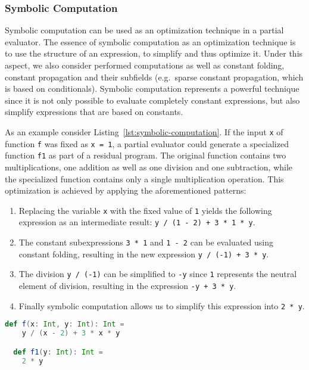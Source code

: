 \subsubsection*{Symbolic Computation}

Symbolic computation can be used as an optimization technique in a partial evaluator.
The essence of symbolic computation as an optimization technique is to use the structure of an expression, to simplify and thus optimize it.
Under this aspect, we also consider performed computations as well as constant folding, constant propagation and their subfields (e.g.\ sparse constant propagation, which is based on conditionals).
Symbolic computation represents a powerful technique since it is not only possible to evaluate completely constant expressions, but also simplify expressions that are based on constants.

As an example consider Listing~\ref{lst:symbolic-computation}.
If the input \texttt{x} of function \texttt{f} was fixed as \texttt{x = 1}, a partial evaluator could generate a specialized function \texttt{f1} as part of a residual program.
The original function contains two multiplications, one addition as well as one division and one subtraction, while the specialized function contains only a single multiplication operation.
This optimization is achieved by applying the aforementioned patterns:

\begin{enumerate}
\item Replacing the variable \texttt{x} with the fixed value of \texttt{1} yields the following expression as an intermediate result: \texttt{y / (1 - 2) + 3 * 1 * y}.
\item The constant subexpressions \texttt{3 * 1} and \texttt{1 - 2} can be evaluated using constant folding, resulting in the new expression \texttt{y / (-1) + 3 * y}.
\item The division \texttt{y / (-1)} can be simplified to \texttt{-y} since \texttt{1} represents the neutral element of division, resulting in the expression \texttt{-y + 3 * y}.
\item Finally symbolic computation allows us to simplify this expression into \texttt{2 * y}.
\end{enumerate}

\begin{lstlisting}[language=scala,caption={Definition of a simple function and its specialization.},label={lst:symbolic-computation}]
  def f(x: Int, y: Int): Int =
    y / (x - 2) + 3 * x * y

  def f1(y: Int): Int =
    2 * y
\end{lstlisting}


